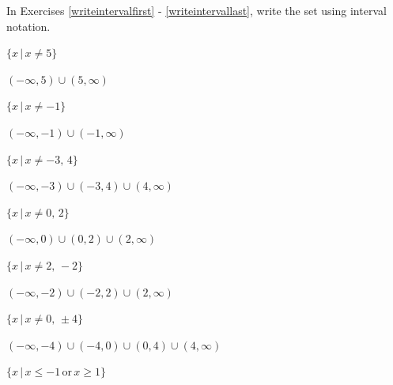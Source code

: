 \documentclass{ximera}
\begin{document}
\begin{question}
In Exercises \ref{writeintervalfirst} - \ref{writeintervallast}, write the set using interval notation.   

\begin{problem}\label{writeintervalfirst}
$\{x\,|\, x \neq 5 \}$ 

\begin{solution}
    $(-\infty, 5) \cup (5, \infty)$
\end{solution}
\end{problem}

\begin{problem}
$\{x\,|\, x \neq -1 \}$

\begin{solution}
    $(-\infty, -1) \cup (-1, \infty)$
\end{solution}
\end{problem}

\begin{problem}
$\{x\,|\, x \neq -3,\, 4 \}$

\begin{solution}
     $(-\infty, -3) \cup (-3, 4)\cup (4, \infty)$
\end{solution}
\end{problem}

\begin{problem}
$\{x\,|\, x \neq 0, \, 2 \}$

\begin{solution}
    $(-\infty, 0) \cup (0, 2)\cup (2, \infty)$
\end{solution}
\end{problem}

\begin{problem}
$\{x\,|\, x \neq 2, \, -2 \}$

\begin{solution}
    $(-\infty, -2) \cup (-2, 2)\cup (2, \infty)$
\end{solution}
\end{problem}

\begin{problem}
$\{x\,|\, x \neq 0,\, \pm 4 \}$

\begin{solution}
    $(-\infty, -4) \cup (-4, 0) \cup (0, 4) \cup (4, \infty)$
\end{solution}
\end{problem}

\begin{problem}
$\{x\,|\, x \leq -1 \, \text{or} \, x \geq 1 \}$


\end{problem}
\end{question}
\end{document}
